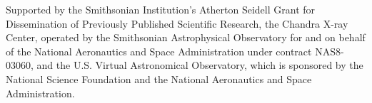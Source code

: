 \acknowledgements Supported by the Smithsonian Institution's Atherton Seidell Grant for Dissemination of Previously Published Scientific Research, the Chandra X-ray Center, operated by the Smithsonian Astrophysical Observatory for and on behalf of the National Aeronautics and Space Administration under contract NAS8-03060, and the U.S. Virtual Astronomical Observatory, which is sponsored by the National Science Foundation and the National Aeronautics and Space Administration.



